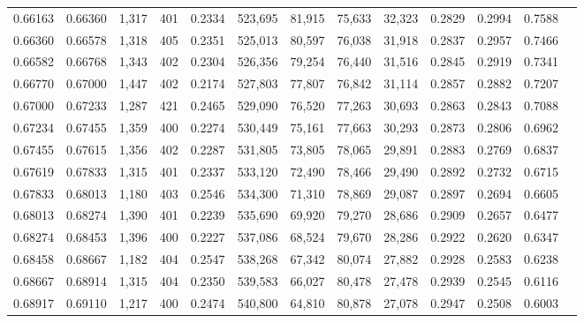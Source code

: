 \begin{tabular}{rrrrrrrrrrrrr}
0.66163 & 0.66360 &  1,317 &   401 &                                     0.2334 & 523,695 &  81,915 &  75,633 &  32,323 & 0.2829 & 0.2994 & 0.7588 \\
0.66360 & 0.66578 &  1,318 &   405 &                                     0.2351 & 525,013 &  80,597 &  76,038 &  31,918 & 0.2837 & 0.2957 & 0.7466 \\
0.66582 & 0.66768 &  1,343 &   402 &                                     0.2304 & 526,356 &  79,254 &  76,440 &  31,516 & 0.2845 & 0.2919 & 0.7341 \\
0.66770 & 0.67000 &  1,447 &   402 &                                     0.2174 & 527,803 &  77,807 &  76,842 &  31,114 & 0.2857 & 0.2882 & 0.7207 \\
0.67000 & 0.67233 &  1,287 &   421 &                                     0.2465 & 529,090 &  76,520 &  77,263 &  30,693 & 0.2863 & 0.2843 & 0.7088 \\
0.67234 & 0.67455 &  1,359 &   400 &                                     0.2274 & 530,449 &  75,161 &  77,663 &  30,293 & 0.2873 & 0.2806 & 0.6962 \\
0.67455 & 0.67615 &  1,356 &   402 &                                     0.2287 & 531,805 &  73,805 &  78,065 &  29,891 & 0.2883 & 0.2769 & 0.6837 \\
0.67619 & 0.67833 &  1,315 &   401 &                                     0.2337 & 533,120 &  72,490 &  78,466 &  29,490 & 0.2892 & 0.2732 & 0.6715 \\
0.67833 & 0.68013 &  1,180 &   403 &                                     0.2546 & 534,300 &  71,310 &  78,869 &  29,087 & 0.2897 & 0.2694 & 0.6605 \\
0.68013 & 0.68274 &  1,390 &   401 &                                     0.2239 & 535,690 &  69,920 &  79,270 &  28,686 & 0.2909 & 0.2657 & 0.6477 \\
0.68274 & 0.68453 &  1,396 &   400 &                                     0.2227 & 537,086 &  68,524 &  79,670 &  28,286 & 0.2922 & 0.2620 & 0.6347 \\
0.68458 & 0.68667 &  1,182 &   404 &                                     0.2547 & 538,268 &  67,342 &  80,074 &  27,882 & 0.2928 & 0.2583 & 0.6238 \\
0.68667 & 0.68914 &  1,315 &   404 &                                     0.2350 & 539,583 &  66,027 &  80,478 &  27,478 & 0.2939 & 0.2545 & 0.6116 \\
0.68917 & 0.69110 &  1,217 &   400 &                                     0.2474 & 540,800 &  64,810 &  80,878 &  27,078 & 0.2947 & 0.2508 & 0.6003 \\

\end{tabular}
